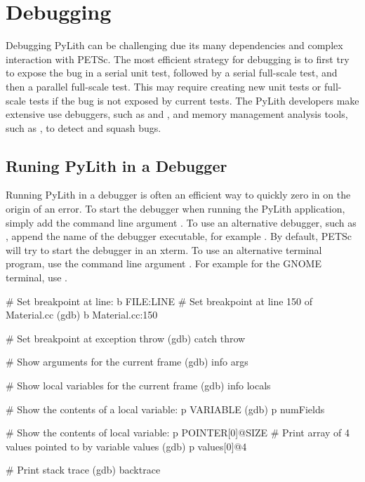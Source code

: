 \section{Debugging}
\label{sec:developer:debugging}

Debugging PyLith can be challenging due its many dependencies and complex interaction with PETSc. The most efficient
strategy for debugging is to first try to expose the bug in a serial unit test, followed by a serial full-scale test,
and then a parallel full-scale test. This may require creating new unit tests or full-scale tests if the bug is not
exposed by current tests. The PyLith developers make extensive use debuggers, such as  and
, and memory management analysis tools, such as , to detect and squash bugs.

\subsection{Runing PyLith in a Debugger}

Running PyLith in a debugger is often an efficient way to quickly zero in on the origin of an error. To start the
 debugger when running the PyLith application, simply add the command line argument
. To use an alternative debugger, such as , append the name
of the debugger executable, for example . By default, PETSc will try to
start the debugger in an xterm. To use an alternative terminal program, use the command line argument
. For example for the GNOME terminal, use
.


\begin{shell}
# Set breakpoint at line: b FILE:LINE
# Set breakpoint at line 150 of Material.cc
(gdb) b Material.cc:150

# Set breakpoint at exception throw
(gdb) catch throw

# Show arguments for the current frame
(gdb) info args

# Show local variables for the current frame
(gdb) info locals

# Show the contents of a local variable: p VARIABLE
(gdb) p numFields

# Show the contents of local variable: p POINTER[0]@SIZE
# Print array of 4 values pointed to by variable values
(gdb) p values[0]@4

# Print stack trace
(gdb) backtrace
\end{shell}


